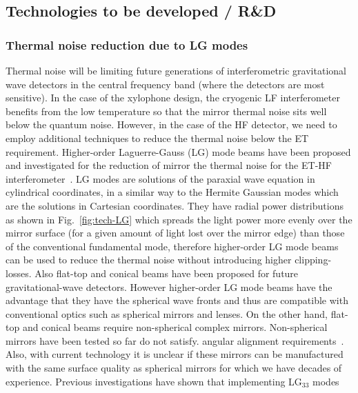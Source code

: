 \FloatBarrier
\subsection{Technologies to be developed / R\&D} \label{sec:RD}
\FloatBarrier
\subsubsection{Thermal noise reduction due to LG modes}
\label{sec:thermalnoiseLG}

Thermal noise will be limiting future generations of interferometric gravitational wave
detectors in the central frequency band (where the detectors are most sensitive). In the case of the xylophone design, the cryogenic LF interferometer benefits from the 
low temperature so that the mirror thermal noise sits well below the quantum noise.
However, in the case of the HF detector, we need to employ additional techniques
to reduce the thermal noise below the ET requirement.
Higher-order Laguerre-Gauss (LG) mode beams
have been proposed and investigated for the reduction of mirror the thermal noise
for the ET-HF interferometer~\cite{Mours06, Vinet2007}.
LG modes are solutions of the paraxial wave equation in cylindrical coordinates,
in a similar way to the Hermite Gaussian modes which are the solutions in Cartesian coordinates.
They have radial power distributions as shown in Fig.~\ref{fig:tech-LG}
which spreads the light power more evenly over the mirror surface (for a given
amount of light lost over the mirror edge) than those of the conventional fundamental mode,
therefore higher-order LG mode beams can be used to reduce the thermal noise
without introducing higher clipping-losses.
%
Also flat-top and conical beams have been proposed
for future gravitational-wave detectors. However
higher-order LG mode beams have the advantage
that they have the spherical wave fronts
and thus are compatible with conventional optics
such as spherical mirrors and lenses.
On the other hand, flat-top and conical beams require non-spherical complex mirrors.
Non-spherical mirrors have been tested so far do not satisfy.
angular alignment requirements~\cite{savov06}.
Also, with current technology it is unclear if these mirrors can be manufactured with
the same surface quality as spherical mirrors for which we have decades of experience.
Previous investigations have shown that implementing LG$_{33}$ modes

